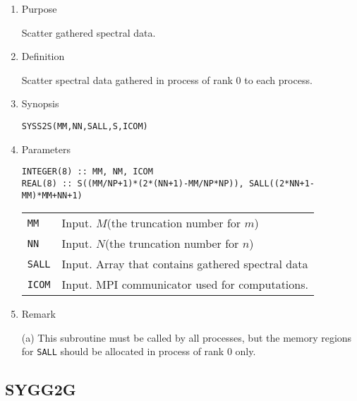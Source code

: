 \documentclass[a4paper]{scrartcl}
\begin{document}
\begin{enumerate}

\item Purpose

Scatter gathered spectral data.  

\item Definition

Scatter spectral data gathered in process of rank 0 to each process.  

\item Synopsis 

\texttt{SYSS2S(MM,NN,SALL,S,ICOM)}
  
\item Parameters

\begin{verbatim}        
INTEGER(8) :: MM, NM, ICOM
REAL(8) :: S((MM/NP+1)*(2*(NN+1)-MM/NP*NP)), SALL((2*NN+1-MM)*MM+NN+1)
\end{verbatim}      
  

\begin{tabular}{ll}
\texttt{MM} & Input. $M$(the truncation number for $m$)\\
\texttt{NN} & Input. $N$(the truncation number for $n$)\\
\texttt{SALL} &  Input. Array that contains gathered spectral data\\
\texttt{ICOM} & Input. MPI communicator used for computations.
\end{tabular}

\item Remark

(a) This subroutine must be called by all processes, but
the memory regions for \texttt{SALL} 
should be allocated in process of rank 0 only.

\end{enumerate}


\subsection{SYGG2G}
\end{document}

